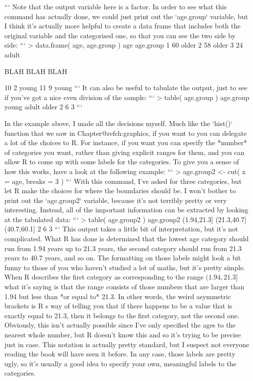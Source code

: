 ```
Note that the output variable here is a factor. In order to see what this command has actually done, we could just print out the `age.group` variable, but I think it's actually more helpful to create a data frame that includes both the original variable and the categorised one, so that you can see the two side by side:
```
> data.frame( age, age.group )
   age age.group
1   60     older
2   58     older
3   24     adult

BLAH BLAH BLAH

10   2     young
11   9     young
```
It can also be useful to tabulate the output, just to see if you've got a nice even division of the sample:
```
> table( age.group )
age.group
young adult older 
    2     6     3 
```

In the example above, I made all the decisions myself. Much like the `hist()` function that we saw in Chapter@refch:graphics, if you want to you can delegate a lot of the choices to R. For instance, if you want you can specify the *number* of categories you want, rather than giving explicit ranges for them, and you can allow R to come up with some labels for the categories. To give you a sense of how this works, have a look at the following example:
```
> age.group2 <- cut( x = age, breaks = 3 )
```
With this command, I've asked for three categories, but let R make the choices for where the boundaries should be. I won't bother to print out the `age.group2` variable, because it's not terribly pretty or very interesting. Instead, all of the important information can be extracted by looking at the tabulated data:
```
> table( age.group2 )
age.group2
(1.94,21.3] (21.3,40.7] (40.7,60.1] 
          2           6           3 
```
This output takes a little bit of interpretation, but it's not complicated. What R has done is determined that the lowest age category should run from 1.94 years up to 21.3 years, the second category should run from 21.3 years to 40.7 years, and so on. The formatting on those labels might look a bit funny to those of you who haven't studied a lot of maths, but it's pretty simple. When R describes the first category as corresponding to the range $(1.94, 21.3]$ what it's saying is that the range consists of those numbers that are larger than 1.94 but less than *or equal to* 21.3. In other words, the weird asymmetric brackets is R s way of telling you that if there happens to be a value that is exactly equal to 21.3, then it belongs to the first category, not the second one. Obviously, this isn't actually possible since I've only specified the ages to the nearest whole number, but R doesn't know this and so it's trying to be precise just in case. This notation is actually pretty standard, but I suspect not everyone reading the book will have seen it before. In any case, those labels are pretty ugly, so it's usually a good idea to specify your own, meaningful labels to the categories.

